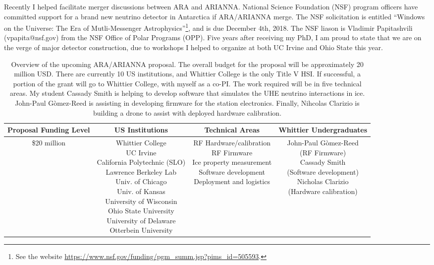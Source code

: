 \documentclass[../../main.tex]{subfiles}
\begin{document}
Recently I helped facilitate merger discussions between ARA and ARIANNA.  National Science Foundation (NSF) program officers have committed support for a brand new neutrino detector in Antarctica if ARA/ARIANNA merge.  The NSF solicitation is entitled ``Windows on the Universe: The Era of Mutli-Messenger Astrophysics''\footnote{See the website \url{https://www.nsf.gov/funding/pgm_summ.jsp?pims_id=505593}.}, and is due December 4th, 2018.  The NSF liason is Vladimir Papitashvili (vpapita@nsf.gov) from the NSF Office of Polar Programs (OPP).  Five years after receiving my PhD, I am proud to state that we are on the verge of major detector construction, due to workshops I helped to organize at both UC Irvine and Ohio State this year. \\ \hspace{0.1cm}

\begin{table}[ht]
\centering
\begin{tabular}{|c|c|c|c|}
\hline
Proposal Funding Level & US Institutions & Technical Areas & Whittier Undergraduates \\ \hline \hline
\$20 million & \makecell{Whittier College \\ UC Irvine \\ California Polytechnic (SLO) \\ Lawrence Berkeley Lab \\ Univ. of Chicago \\ Univ. of Kansas \\ University of Wisconsin \\ Ohio State University \\ University of Delaware \\ Otterbein University} & \makecell{RF Hardware/calibration \\ RF Firmware \\ Ice property measurement \\ Software development \\ Deployment and logistics} & \makecell{John-Paul G\`{o}mez-Reed \\ (RF Firmware) \\ Cassady Smith \\ (Software development) \\ Nicholas Clarizio \\ (Hardware calibration)} \\ \hline
\end{tabular}
\caption{\label{tab:proposal} Overview of the upcoming ARA/ARIANNA proposal.  The overall budget for the proposal will be approximately 20 million USD.  There are currently 10 US institutions, and Whittier College is the only Title V HSI.  If successful, a portion of the grant will go to Whittier College, with myself as a co-PI.  The work required will be in five technical areas.  My student Cassady Smith is helping to develop software that simulates the UHE neutrino interactions in ice.  John-Paul G\`{o}mez-Reed is assisting in developing firmware for the station electronics.  Finally, Nihcolas Clarizio is building a drone to assist with deployed hardware calibration.}
\end{table}
\end{document}
